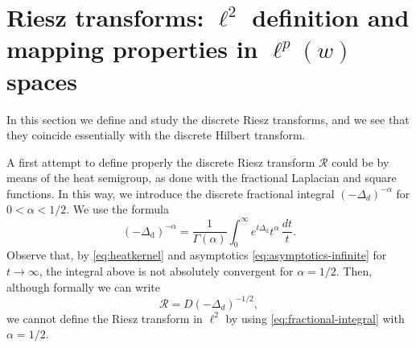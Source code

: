 \documentclass[11pt]{amsart}
\numberwithin{equation}{section}
\newcommand{\dis}{\mathrm{d}}
\theoremstyle{plain}
\theoremstyle{remark}
\begin{document}
\section{Riesz transforms: $\ell^2$ definition and mapping properties in $\ell^p(w)$ spaces}
\label{sec:Riesz}

In this section we define and study the discrete Riesz transforms, and we see that they coincide essentially with the discrete Hilbert transform.

A first attempt to define properly the discrete Riesz transform $\mathcal{R}$ could be by means of the heat semigroup, as done with the fractional Laplacian and square functions. In this way, we introduce the discrete fractional integral $(-\Delta_{d})^{-\alpha}$ for $0< \alpha < 1/2$. We use the formula
\begin{equation}
\label{eq:fractional-integral}
(-\Delta_{\dis})^{-\alpha} = \frac1{\Gamma(\alpha)} \int_0^\infty  e^{t\Delta_{\dis}} t^{\alpha} \,\frac{dt}{t}.
\end{equation}
Observe that, by \eqref{eq:heatkernel} and asymptotics \eqref{eq:asymptotics-infinite} for $t\to \infty$, the integral above is not absolutely convergent for $\alpha=1/2$.
Then, although formally we can write
\[
\mathcal{R}=D(-\Delta_{d})^{-1/2},
\]
we cannot define the Riesz transform in $\ell^2$ by using \eqref{eq:fractional-integral} with $\alpha=1/2$.
\end{document}
